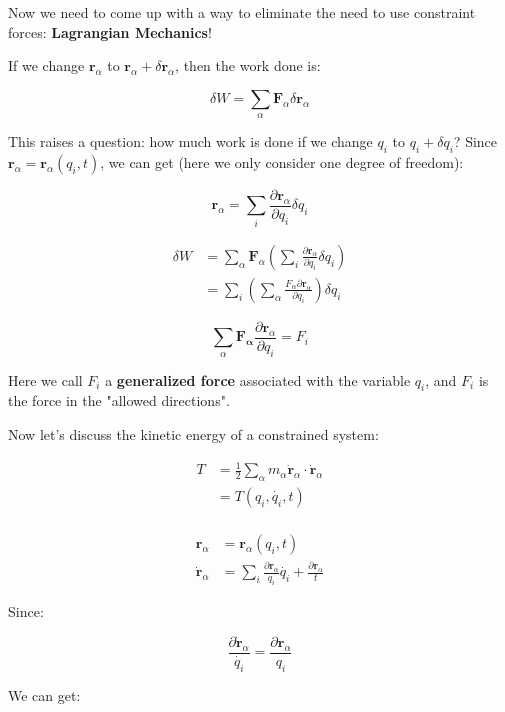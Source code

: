 Now we need to come up with a way to eliminate the need to use constraint forces: \textbf{Lagrangian Mechanics}!

If we change $\mathbf{r}_\alpha$ to $\mathbf{r}_\alpha+\delta \mathbf{r}_\alpha$, then the work done is:

\[
   \delta W = \sum_{\alpha} \mathbf{F}_\alpha \delta \mathbf{r}_\alpha
\]

This raises a question: how much work is done if we change $q_i$ to $q_i+\delta q_i$? Since $\mathbf{r}_\alpha = \mathbf{r}_\alpha(q_i, t)$, we can get (here we only consider one degree of freedom):

\[
   \mathbf{r}_\alpha = \sum_{i} \frac{\partial \mathbf{r}_\alpha}{\partial q_i} \delta q_i
\]

\begin{align*}
    \delta W &= \sum_{\alpha} \mathbf{F}_\alpha \left(\sum_{i} \frac{\partial \mathbf{r}_\alpha}{\partial q_i} \delta q_i \right) \\
             &= \sum_{i} \left(\sum_{\alpha} \frac{F_{\alpha} \partial \mathbf{r}_\alpha}{\partial q_i} \right) \delta q_i
\end{align*}

\[
   \sum_{\alpha} \mathbf{F_{\alpha}} \frac{\partial \mathbf{r}_\alpha}{\partial q_i} = F_i
\]

Here we call $F_i$ a \textbf{generalized force} associated with the variable $q_i$, and $F_i$ is the force in the "allowed directions". 

Now let's discuss the kinetic energy of a constrained system:

\begin{align*}
    T &= \frac{1}{2} \sum_{\alpha} m_\alpha \dot{\mathbf{r}}_\alpha \cdot \dot{\mathbf{r}}_\alpha \\
      &= T(q_i, \dot{q_i}, t) \\
\end{align*}

\begin{align*}
    \mathbf{r}_\alpha &= \mathbf{r}_\alpha(q_i, t) \\
    \dot{\mathbf{r}}_\alpha &= \sum_i \frac{\partial \mathbf{r}_\alpha}{q_i} \dot{q_i} + \frac{\partial \mathbf{r}_\alpha}{t}
\end{align*}

Since:

\[
    \frac{\partial \dot{\mathbf{r}}_\alpha}{\dot{q_i}} = \frac{\partial \mathbf{r}_\alpha}{q_i}
\]

We can get:

